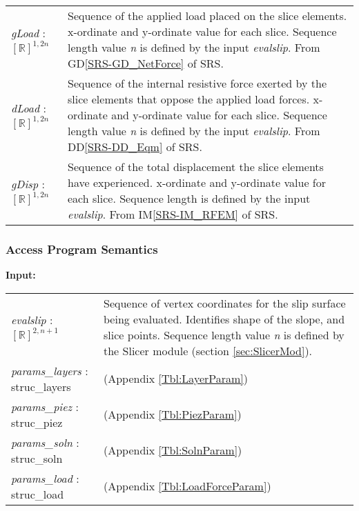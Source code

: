 \documentclass[12pt]{article}
\begin{document}
\renewcommand*{\arraystretch}{1.5}
\begin{longtable}{p{} p{}}
  \textit{gLoad} : $[\mathbb{R}]^{1,2n}$ & Sequence of the applied
  load placed on the slice elements. x-ordinate and y-ordinate value
  for each slice. Sequence length value \textit{n} is defined by the
  input \textit{evalslip}. From GD\ref{SRS-GD_NetForce} of SRS.\\

  \textit{dLoad} : $[\mathbb{R}]^{1,2n}$ & Sequence of the internal
  resistive force exerted by the slice elements that oppose the
  applied load forces. x-ordinate and y-ordinate value for each
  slice. Sequence length value \textit{n} is defined by the input
  \textit{evalslip}. From DD\ref{SRS-DD_Eqm} of SRS.\\

  \textit{gDisp} : $[\mathbb{R}]^{1,2n}$ & Sequence of the total
  displacement the slice elements have experienced. x-ordinate and
  y-ordinate value for each slice. Sequence length is defined by the
  input \textit{evalslip}. From IM\ref{SRS-IM_RFEM} of SRS.\\
\end{longtable}

\subsubsection{Access Program Semantics}

\textbf{Input:}
\renewcommand*{\arraystretch}{1.5}
\begin{longtable} {p{} p{}}
  \textit{evalslip} : $[\mathbb{R}]^{2,n+1}$ & Sequence of vertex
  coordinates for the slip surface being evaluated. Identifies shape
  of the slope, and slice points. Sequence length value \textit{n} is
  defined by the Slicer module (section \ref{sec:SlicerMod}). \\

  \textit{params\_layers} : struc\_layers & (Appendix
  \ref{Tbl:LayerParam})\\

  \textit{params\_piez} : struc\_piez & (Appendix
  \ref{Tbl:PiezParam})\\

  \textit{params\_soln} : struc\_soln & (Appendix
  \ref{Tbl:SolnParam})\\

  \textit{params\_load} : struc\_load & (Appendix
  \ref{Tbl:LoadForceParam})
\end{longtable}
\end{document}
